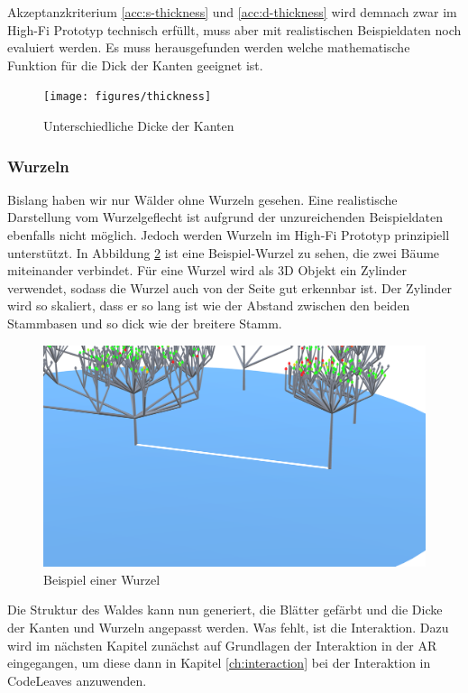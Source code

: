 Akzeptanzkriterium \ref{acc:s-thickness} und \ref{acc:d-thickness} wird demnach zwar im High-Fi Prototyp technisch erfüllt, muss aber mit realistischen Beispieldaten noch evaluiert werden. Es muss herausgefunden werden welche mathematische Funktion für die Dick der Kanten geeignet ist.

\begin{figure}[htb]
  \texttt{[image: figures/thickness]}
  \caption{Unterschiedliche Dicke der Kanten}
  \label{fig:thickness}
\end{figure}

\subsubsection*{Wurzeln}

Bislang haben wir nur Wälder ohne Wurzeln gesehen. Eine realistische Darstellung vom Wurzelgeflecht ist aufgrund der unzureichenden Beispieldaten ebenfalls nicht möglich. Jedoch werden Wurzeln im High-Fi Prototyp prinzipiell  unterstützt. In Abbildung \ref{fig:root} ist eine Beispiel-Wurzel zu sehen, die zwei Bäume miteinander verbindet. Für eine Wurzel wird als 3D Objekt ein Zylinder verwendet, sodass die Wurzel auch von der Seite gut erkennbar ist. Der Zylinder wird so skaliert, dass er so lang ist wie der Abstand zwischen den beiden Stammbasen und so dick wie der breitere Stamm.

\begin{figure}[htb]
  \includegraphics[width=\textwidth]{figures/root}
  \caption{Beispiel einer Wurzel}
  \label{fig:root}
\end{figure}

Die Struktur des Waldes kann nun generiert, die Blätter gefärbt und die Dicke der Kanten und Wurzeln angepasst werden. Was fehlt, ist die Interaktion. Dazu wird im nächsten Kapitel zunächst auf Grundlagen der Interaktion in der AR eingegangen, um diese dann in Kapitel \ref{ch:interaction} bei der Interaktion in CodeLeaves anzuwenden.

